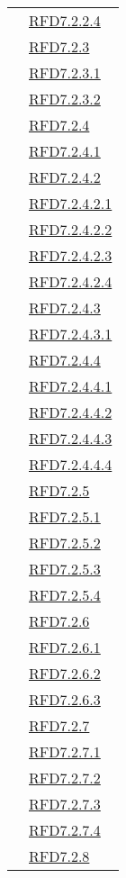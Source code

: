 \begin{longtable}{|>{\centering}m{5cm}|m{5cm}<{\centering}|}
& \hyperlink{RFD7.2.2.4}{RFD7.2.2.4}\\
& \hyperlink{RFD7.2.3}{RFD7.2.3}\\
& \hyperlink{RFD7.2.3.1}{RFD7.2.3.1}\\
& \hyperlink{RFD7.2.3.2}{RFD7.2.3.2}\\
& \hyperlink{RFD7.2.4}{RFD7.2.4}\\
& \hyperlink{RFD7.2.4.1}{RFD7.2.4.1}\\
& \hyperlink{RFD7.2.4.2}{RFD7.2.4.2}\\
& \hyperlink{RFD7.2.4.2.1}{RFD7.2.4.2.1}\\
& \hyperlink{RFD7.2.4.2.2}{RFD7.2.4.2.2}\\
& \hyperlink{RFD7.2.4.2.3}{RFD7.2.4.2.3}\\
& \hyperlink{RFD7.2.4.2.4}{RFD7.2.4.2.4}\\
& \hyperlink{RFD7.2.4.3}{RFD7.2.4.3}\\
& \hyperlink{RFD7.2.4.3.1}{RFD7.2.4.3.1}\\
& \hyperlink{RFD7.2.4.4}{RFD7.2.4.4}\\
& \hyperlink{RFD7.2.4.4.1}{RFD7.2.4.4.1}\\
& \hyperlink{RFD7.2.4.4.2}{RFD7.2.4.4.2}\\
& \hyperlink{RFD7.2.4.4.3}{RFD7.2.4.4.3}\\
& \hyperlink{RFD7.2.4.4.4}{RFD7.2.4.4.4}\\
& \hyperlink{RFD7.2.5}{RFD7.2.5}\\
& \hyperlink{RFD7.2.5.1}{RFD7.2.5.1}\\
& \hyperlink{RFD7.2.5.2}{RFD7.2.5.2}\\
& \hyperlink{RFD7.2.5.3}{RFD7.2.5.3}\\
& \hyperlink{RFD7.2.5.4}{RFD7.2.5.4}\\
& \hyperlink{RFD7.2.6}{RFD7.2.6}\\
& \hyperlink{RFD7.2.6.1}{RFD7.2.6.1}\\
& \hyperlink{RFD7.2.6.2}{RFD7.2.6.2}\\
& \hyperlink{RFD7.2.6.3}{RFD7.2.6.3}\\
& \hyperlink{RFD7.2.7}{RFD7.2.7}\\
& \hyperlink{RFD7.2.7.1}{RFD7.2.7.1}\\
& \hyperlink{RFD7.2.7.2}{RFD7.2.7.2}\\
& \hyperlink{RFD7.2.7.3}{RFD7.2.7.3}\\
& \hyperlink{RFD7.2.7.4}{RFD7.2.7.4}\\
& \hyperlink{RFD7.2.8}{RFD7.2.8}\\

\end{longtable}

